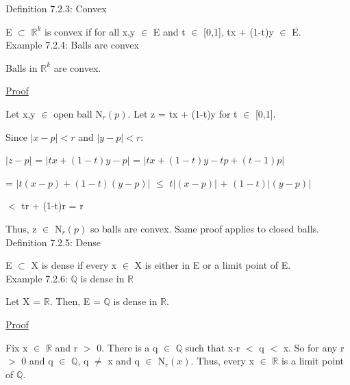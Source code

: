 { \color{blue} Definition 7.2.3: Convex } 

	\begin{adjustbox}{minipage=14cm, right, vspace=0.1cm 0cm}
		E $\subset$ $\mathbb{R}^k$ is {\color{lblue} convex} if for all
		x,y $\in$ E and t $\in$ [0,1], tx + (1-t)y $\in$ E. \\
	\end{adjustbox}

{ \color{purple} Example 7.2.4: Balls are convex }

	\begin{adjustbox}{minipage=14cm, right, vspace=0.1cm 0cm}
		Balls in $\mathbb{R}^k$ are convex.
	\end{adjustbox}

{ \color{magenta} \underline{Proof} }

	Let x,y $\in$ open ball N$_r(p)$. Let z = tx + (1-t)y for t $\in$ [0,1].
	
	Since $|x - p| < r$ and $|y - p| < r$:

	\hspace{1cm} $|z - p|$ = $|tx + (1-t)y - p|$ = $|tx + (1-t)y - tp + (t-1)p|$

	\hspace{2.3cm} = $|t(x-p) + (1-t)(y-p)|$ $\leq$ $t|(x-p)|$ + $(1-t)|(y-p)|$

	\hspace{2.3cm} $<$ tr + (1-t)r = r

	Thus, z $\in$ N$_r(p)$ so balls are convex. Same proof applies to closed balls. \\

{ \color{blue} Definition 7.2.5: Dense } 

	\begin{adjustbox}{minipage=14cm, right, vspace=0.1cm 0cm}
		E $\subset$ X is dense if every x $\in$ X is either in E or
		a limit point of E. \\
	\end{adjustbox}

{ \color{purple} Example 7.2.6: $\mathbb{Q}$ is dense in $\mathbb{R}$ } 

	\qquad Let X = $\mathbb{R}$.
	Then, E = $\mathbb{Q}$ is dense in $\mathbb{R}$.

{ \color{magenta} \underline{Proof} } 

	Fix x $\in$ $\mathbb{R}$ and r $>$ 0.
	There is a q $\in$ $\mathbb{Q}$ such that x-r $<$ q $<$ x.
	So for any r $>$ 0 and q $\in$ $\mathbb{Q}$, q $\neq$ x and
	q $\in$ N$_r(x)$.
	Thus, every x $\in$ $\mathbb{R}$ is a limit point of $\mathbb{Q}$.





